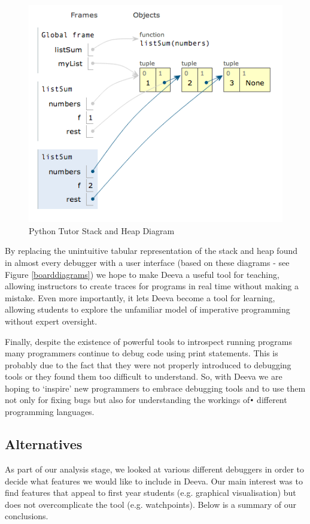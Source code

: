 \documentclass[11pt, a4paper]{article}
\begin{document}
\begin{figure}[h!]
\centering
\includegraphics[width=125mm]{PythonTutorStackHeap.png}
\caption{Python Tutor Stack and Heap Diagram}
\end{figure}

By replacing the unintuitive tabular representation of the stack and heap found in almost every debugger with a user interface (based on these diagrams - see Figure \ref{boarddiagrams}) we hope to make Deeva a useful tool for teaching,
allowing instructors to create traces for programs in real time without making a mistake.
Even more importantly, it lets Deeva become a tool for learning, allowing students to explore the unfamiliar model of imperative programming without expert oversight.

Finally, despite the existence of powerful tools to introspect running programs many programmers continue to debug code using print statements.
This is probably due to the fact that they were not properly introduced to debugging tools or they found them too difficult to understand. So, with Deeva we are hoping to `inspire' new programmers to embrace debugging tools and to use them not only  for fixing bugs but also for understanding the workings of\texttt{•} different programming languages.   

\subsection{Alternatives}
As part of our analysis stage, we looked at various different debuggers in order to decide what features we would like to include in Deeva. Our main interest was to find features that appeal to first year students (e.g. graphical visualisation) but does not overcomplicate the tool (e.g. watchpoints). 
Below is a summary of our conclusions.
\end{document}
